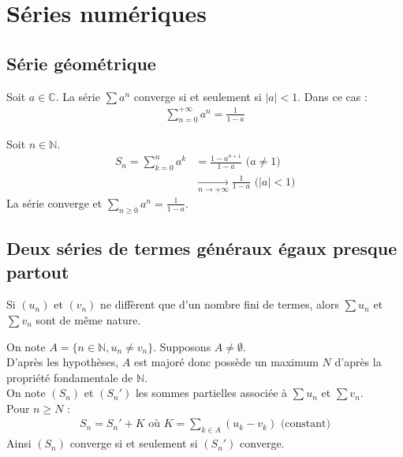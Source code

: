 \documentclass[../main.tex]{subfiles}
\begin{document}
\setcounter{chapter}{26}
\chapter{Séries numériques}
\tableofcontents
\clearpage

\section{Série géométrique}
\begin{tcolorbox}[title=Théorème 27.6, title filled=false, colframe=orange, colback=orange!10!white]
    Soit $a\in \mathbb{C}$. La série $\sum a^n$ converge si et seulement si $|a|<1$. Dans ce cas : 
    \begin{align*}
        \sum_{n=0}^{+\infty} a^n = \frac{1}{1-a}
    \end{align*}
\end{tcolorbox}

\noindent Soit $n\in \mathbb{N}$. 
\begin{align*}
    S_n = \sum_{k=0}^{n} a^k &= \frac{1-a^{n+1}}{1-a} \text{ ($a\neq 1$)} \\
    &\underset{n \to +\infty}{\longrightarrow} \frac{1}{1-a} \text{ ($|a|<1$)}
\end{align*}
La série converge et $\sum\limits_{n\geq 0} a^n = \frac{1}{1-a}$. 

\section{Deux séries de termes généraux égaux presque partout}
\begin{tcolorbox}[title=Propostion 27.11, title filled=false, colframe=lightblue, colback=lightblue!10!white]
    Si $(u_n)$ et $(v_n)$ ne diffèrent que d'un nombre fini de termes, alors $\sum u_n$ et $\sum v_n$ sont de même nature. 
\end{tcolorbox}

\noindent On note $A = \{ n\in \mathbb{N}, u_n \neq v_n \}$. Supposons $A\neq \emptyset$. \\
D'après les hypothèses, $A$ est majoré donc possède un maximum $N$ d'après la propriété fondamentale de $\mathbb{N}$. \\
On note $(S_n)$ et $(S_n')$ les sommes partielles associée à $\sum u_n$ et $\sum v_n$. \\
Pour $n \geq N$ : 
\begin{align*}
    S_n = S_n' + K \text{ où } K = \sum_{k\in A} (u_k - v_k) \text{ (constant)}
\end{align*}
Ainsi $(S_n)$ converge si et seulement si $(S_n')$ converge. 
\end{document}
